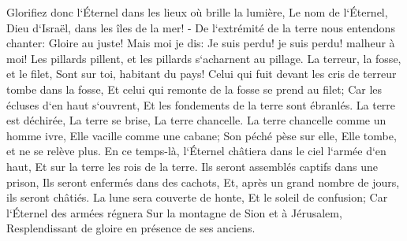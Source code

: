 \verse Glorifiez donc l`Éternel dans les lieux où brille la lumière, Le nom de l`Éternel, Dieu d`Israël, dans les îles de la mer! - 
\verse De l`extrémité de la terre nous entendons chanter: Gloire au juste! Mais moi je dis: Je suis perdu! je suis perdu! malheur à moi! Les pillards pillent, et les pillards s`acharnent au pillage. 
\verse La terreur, la fosse, et le filet, Sont sur toi, habitant du pays! 
\verse Celui qui fuit devant les cris de terreur tombe dans la fosse, Et celui qui remonte de la fosse se prend au filet; Car les écluses d`en haut s`ouvrent, Et les fondements de la terre sont ébranlés. 
\verse La terre est déchirée, La terre se brise, La terre chancelle. 
\verse La terre chancelle comme un homme ivre, Elle vacille comme une cabane; Son péché pèse sur elle, Elle tombe, et ne se relève plus. 
\verse En ce temps-là, l`Éternel châtiera dans le ciel l`armée d`en haut, Et sur la terre les rois de la terre. 
\verse Ils seront assemblés captifs dans une prison, Ils seront enfermés dans des cachots, Et, après un grand nombre de jours, ils seront châtiés. 
\verse La lune sera couverte de honte, Et le soleil de confusion; Car l`Éternel des armées régnera Sur la montagne de Sion et à Jérusalem, Resplendissant de gloire en présence de ses anciens. 

